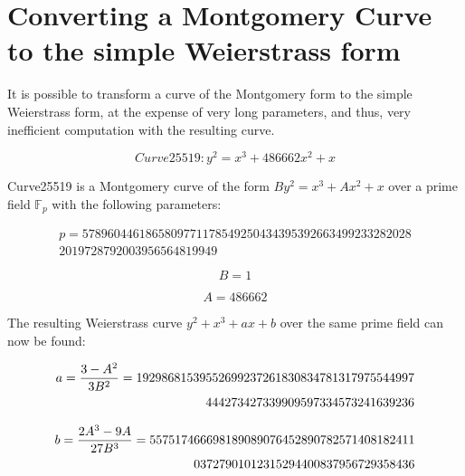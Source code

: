 \section{Converting a Montgomery Curve to the simple Weierstrass form}
\label{app:montgomery_weierstrass}

It is possible to transform a curve of the Montgomery form to the simple Weierstrass form, at the expense
of very long parameters, and thus, very inefficient computation with the resulting curve.\cite{safecurves}

\begin{equation}
	Curve25519: y^2 = x^3 + 486662 x^2 + x
\end{equation}

Curve25519 is a Montgomery curve of the form \(By^2 = x^3 + Ax^2 + x\) over a prime field \(\mathbb{F}_p\) 
with the following parameters:

\begin{equation}
\begin{split}
	p = 5789604461865809771178549250434395392663499233282028\\2019728792003956564819949
\end{split}
\end{equation}

\begin{equation}
	B = 1
\end{equation}

\begin{equation}
	A = 486662
\end{equation}

The resulting Weierstrass curve \(y^2 + x^3 + ax + b\) over the same prime field can now be found:

\begin{equation}
\begin{split}
	a = {{3-A^2} \over {3B^2}} = 19298681539552699237261830834781317975544997\\444273427339909597334573241639236
\end{split}
\end{equation}

\begin{equation}
\begin{split}
	b = {{2A^3-9A} \over {27B^3}} = 557517466698189089076452890782571408182411\\03727901012315294400837956729358436
\end{split}
\end{equation}